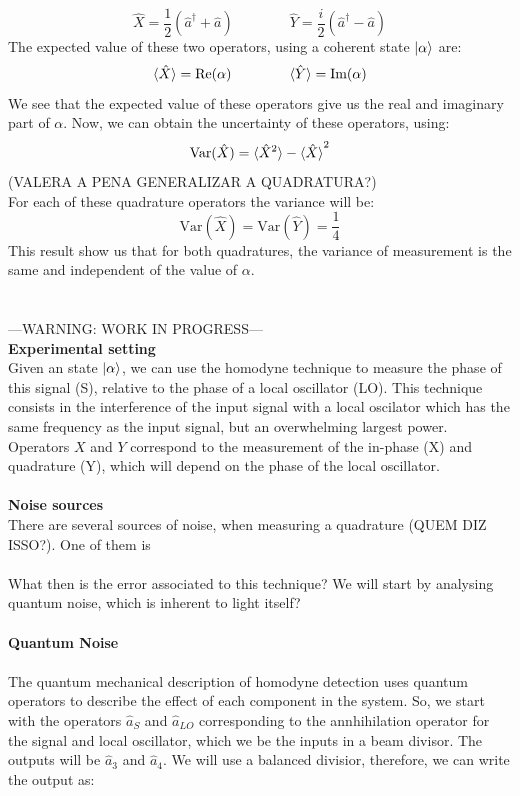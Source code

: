 $$
\hat{X} = \frac{1}{2} \left( \hat{a}^\dagger + \hat{a} \right)
\qquad
\qquad
\hat{Y} = \frac{i}{2} \left( \hat{a}^\dagger - \hat{a} \right)
$$
The expected value of these two operators, using a coherent state $\ket{\alpha}$ are:
$$
\braket{\hat{X}} = \textrm{Re}(\alpha) \qquad \qquad
\braket{\hat{Y}} = \textrm{Im}(\alpha)
$$
We see that the expected value of these operators give us the real and imaginary part of $\alpha$. Now, we can obtain the uncertainty of these operators, using:
$$
\textrm{Var}(\hat{X}) = \braket{\hat{X}^2} - \braket{\hat{X}}^2
$$
(VALERA A PENA GENERALIZAR A QUADRATURA?)\\
For each of these quadrature operators the variance will be:
$$
\textrm{Var}(\hat{X}) = \textrm{Var}(\hat{Y}) = \frac{1}{4}
$$
This result show us that for both quadratures, the variance of measurement is the same and independent of the value of $\alpha$.\\
%
%
%
\\
\\
---WARNING: WORK IN PROGRESS---\\
{\bf Experimental setting}\\
Given an state $\ket{\alpha}$, we can use the homodyne technique to measure the phase of this signal (S), relative to the phase of a local oscillator (LO).
This technique consists in the interference of the input signal with a local oscilator which has the same frequency as the input signal, but an overwhelming largest power.\\
Operators $X$ and $Y$ correspond to the measurement of the in-phase (X) and quadrature (Y), which will depend on the phase of the local oscillator.
\\
\\
{\bf Noise sources}\\
There are several sources of noise, when measuring a quadrature (QUEM DIZ ISSO?). One of them is
\\
\\
What then is the error associated to this technique? We will start by analysing quantum noise, which is inherent to light itself?
\\
\\
{\bf Quantum Noise}\\
\\
The quantum mechanical description of homodyne detection uses quantum operators to describe the effect of each component in the system. So, we start with the operators $\hat{a}_S$ and $\hat{a}_{LO}$ corresponding to the annhihilation operator for the signal and local oscillator, which we be the inputs in a beam divisor. The outputs will be $\hat{a}_3$ and $\hat{a}_4$. We will use a balanced divisior, therefore, we can write the output as:
